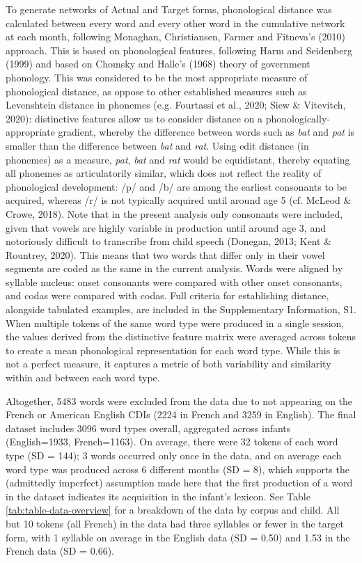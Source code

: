 \documentclass[
  man]{apa6}
\begin{document}
To generate networks of Actual and Target forms, phonological distance was calculated between every word and every other word in the cumulative network at each month, following Monaghan, Christiansen, Farmer and Fitneva's (2010) approach. This is based on phonological features, following Harm and Seidenberg (1999) and based on Chomsky and Halle's (1968) theory of government phonology. This was considered to be the most appropriate measure of phonological distance, as oppose to other established measures such as Levenshtein distance in phonemes (e.g. Fourtassi et al., 2020; Siew \& Vitevitch, 2020): distinctive features allow us to consider distance on a phonologically-appropriate gradient, whereby the difference between words such as \emph{bat} and \emph{pat} is smaller than the difference between \emph{bat} and \emph{rat}. Using edit distance (in phonemes) as a measure, \emph{pat}, \emph{bat} and \emph{rat} would be equidistant, thereby equating all phonemes as articulatorily similar, which does not reflect the reality of phonological development: /p/ and /b/ are among the earliest consonants to be acquired, whereas /r/ is not typically acquired until around age 5 (cf. McLeod \& Crowe, 2018). Note that in the present analysis only consonants were included, given that vowels are highly variable in production until around age 3, and notoriously difficult to transcribe from child speech (Donegan, 2013; Kent \& Rountrey, 2020). This means that two words that differ only in their vowel segments are coded as the same in the current analysis. Words were aligned by syllable nucleus: onset consonants were compared with other onset consonants, and codas were compared with codas. Full criteria for establishing distance, alongside tabulated examples, are included in the Supplementary Information, S1. When multiple tokens of the same word type were produced in a single session, the values derived from the distinctive feature matrix were averaged across tokens to create a mean phonological representation for each word type. While this is not a perfect measure, it captures a metric of both variability and similarity within and between each word type.

Altogether, 5483 words were excluded from the data due to not appearing on the French or American English CDIs (2224 in French and 3259 in English). The final dataset includes 3096 word types overall, aggregated across infants (English=1933, French=1163). On average, there were 32 tokens of each word type (SD = 144); 3 words occurred only once in the data, and on average each word type was produced across 6 different months (SD = 8), which supports the (admittedly imperfect) assumption made here that the first production of a word in the dataset indicates its acquisition in the infant's lexicon. See Table \ref{tab:table-data-overview} for a breakdown of the data by corpus and child. All but 10 tokens (all French) in the data had three syllables or fewer in the target form, with 1 syllable on average in the English data (SD = 0.50) and 1.53 in the French data (SD = 0.66).
\end{document}
